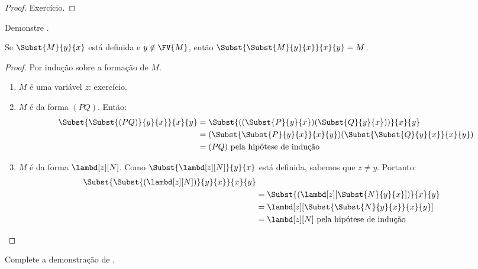 \documentclass[../../../include/open-logic-section]{subfiles}
\begin{document}
\begin{proof}
  Exercício.
\end{proof}

\begin{prob}
  Demonstre .
\end{prob}


\begin{thm}
  Se $\Subst{M}{y}{x}$ está definida e $y \notin \FV{M}$, então
  $\Subst{\Subst{M}{y}{x}}{x}{y} = M$.
\end{thm}

\begin{proof}
  Por indução sobre a formação de $M$.
  \begin{enumerate}
  \item $M$ é uma variável $z$: exercício.
  \item $M$ é da forma $(PQ)$. Então:
    \begin{align*}
      \Subst{\Subst{(PQ)}{y}{x}}{x}{y}
      &=\Subst{((\Subst{P}{y}{x})(\Subst{Q}{y}{x}))}{x}{y} \\
      &= (\Subst{\Subst{P}{y}{x}}{x}{y})(\Subst{\Subst{Q}{y}{x}}{x}{y}) \\
      &= (PQ) \text{ pela hipótese de indução}
    \end{align*}
  \item $M$ é da forma $\lambd[z][N]$. Como
    $\Subst{\lambd[z][N]}{y}{x}$ está definida, sabemos que
    $z \neq y$. Portanto:
    \begin{align*}
      \Subst{\Subst{(\lambd[z][N])}{y}{x}}{x}{y}\\
      & = \Subst{(\lambd[z][\Subst{N}{y}{x}])}{x}{y} \\
      & = \lambd[z][\Subst{\Subst{N}{y}{x}}{x}{y}] \\
      &= \lambd[z][N] \text{ pela hipótese de indução} 
    \end{align*}
  \end{enumerate}
\end{proof}

\begin{prob}
  Complete a demonstração de .
\end{prob}
\end{document}
